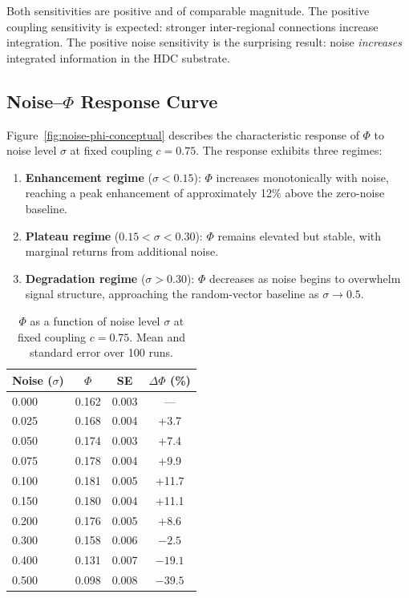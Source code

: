 \documentclass[12pt,a4paper]{article}
\begin{document}
Both sensitivities are positive and of comparable magnitude. The positive coupling sensitivity is expected: stronger inter-regional connections increase integration. The positive noise sensitivity is the surprising result: noise \emph{increases} integrated information in the HDC substrate.

\subsection{Noise--$\Phi$ Response Curve}

Figure~\ref{fig:noise-phi-conceptual} describes the characteristic response of $\Phi$ to noise level $\sigma$ at fixed coupling $c = 0.75$. The response exhibits three regimes:

\begin{enumerate}
    \item \textbf{Enhancement regime} ($\sigma < 0.15$): $\Phi$ increases monotonically with noise, reaching a peak enhancement of approximately 12\% above the zero-noise baseline.
    \item \textbf{Plateau regime} ($0.15 < \sigma < 0.30$): $\Phi$ remains elevated but stable, with marginal returns from additional noise.
    \item \textbf{Degradation regime} ($\sigma > 0.30$): $\Phi$ decreases as noise begins to overwhelm signal structure, approaching the random-vector baseline as $\sigma \to 0.5$.
\end{enumerate}

\begin{table}[H]
\centering
\caption{$\Phi$ as a function of noise level $\sigma$ at fixed coupling $c = 0.75$. Mean and standard error over 100 runs.}
\label{tab:noise-response}
\begin{tabular}{lccc}
\toprule
\textbf{Noise ($\sigma$)} & \textbf{$\Phi$} & \textbf{SE} & \textbf{$\Delta\Phi$ (\%)} \\
\midrule
0.000 & 0.162 & 0.003 & --- \\
0.025 & 0.168 & 0.004 & +3.7 \\
0.050 & 0.174 & 0.003 & +7.4 \\
0.075 & 0.178 & 0.004 & +9.9 \\
0.100 & 0.181 & 0.005 & +11.7 \\
0.150 & 0.180 & 0.004 & +11.1 \\
0.200 & 0.176 & 0.005 & +8.6 \\
0.300 & 0.158 & 0.006 & $-2.5$ \\
0.400 & 0.131 & 0.007 & $-19.1$ \\
0.500 & 0.098 & 0.008 & $-39.5$ \\
\bottomrule
\end{tabular}
\end{table}
\end{document}
